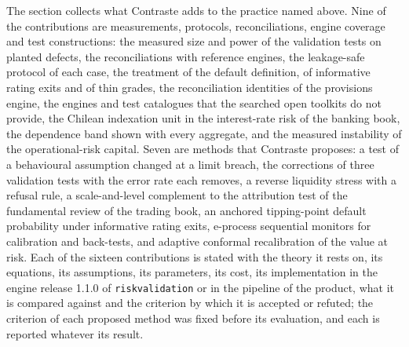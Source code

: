 The section collects what Contraste adds to the practice named above. Nine of the contributions are measurements, protocols, reconciliations, engine coverage and test constructions: the measured size and power of the
validation tests on planted defects, the reconciliations with reference engines, the leakage-safe protocol of each case, the treatment of the default definition, of
informative rating exits and of thin grades, the reconciliation identities of the provisions engine, the engines and test catalogues that the searched open toolkits do not
provide, the Chilean indexation unit in the interest-rate risk of the banking book, the dependence band shown with every aggregate, and the measured instability of the
operational-risk capital. Seven are methods that Contraste proposes: a test of a behavioural assumption changed at a limit breach, the corrections of three validation
tests with the error rate each removes, a reverse liquidity stress with a refusal rule, a scale-and-level complement to the attribution test of the fundamental review of the
trading book, an anchored tipping-point default probability under informative rating exits, e-process sequential monitors for calibration and back-tests, and adaptive
conformal recalibration of the value at risk. Each of the sixteen contributions is stated with the theory
it rests on, its equations, its assumptions, its parameters, its cost, its implementation in the engine release 1.1.0 of
\texttt{riskvalidation} or in the pipeline of the product, what it is compared against and the criterion by which it is accepted
or refuted; the criterion of each proposed method was fixed before its evaluation, and each is reported whatever its result.

